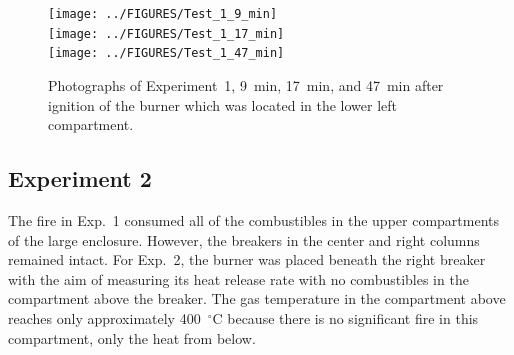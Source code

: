 \documentclass[12pt]{article}
\begin{document}
\begin{figure}[p]
\centering
\texttt{[image: ../FIGURES/Test\_1\_9\_min]} \\
\texttt{[image: ../FIGURES/Test\_1\_17\_min]} \\
\texttt{[image: ../FIGURES/Test\_1\_47\_min]}
\caption[Photographs of Experiment~1]{Photographs of Experiment~1, 9~min, 17~min, and 47~min after ignition of the burner which was located in the lower left compartment.}
\label{fig:Test_1_photos}
\end{figure}



\clearpage

\subsection{Experiment 2}

The fire in Exp.~1 consumed all of the combustibles in the upper compartments of the large enclosure. However, the breakers in the center and right columns remained intact. For Exp.~2, the burner was placed beneath the right breaker with the aim of measuring its heat release rate with no combustibles in the compartment above the breaker. The gas temperature in the compartment above reaches only approximately 400~$^\circ$C because there is no significant fire in this compartment, only the heat from below.
\end{document}

